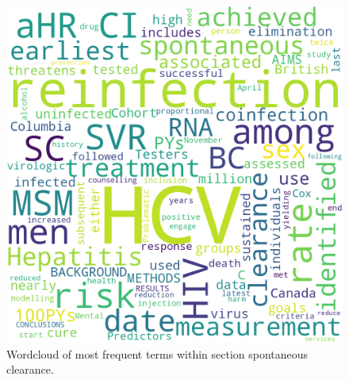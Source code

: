\documentclass{qqtarticle}
\begin{document}
        \begin{figure}[H]
            \centering
            \includegraphics[width=.75\linewidth]{img/spontaneousclearance.png}
            \caption{Wordcloud of most frequent terms within section spontaneous clearance.}
            \label{fig:wcl_spontaneousclearance}
        \end{figure}
\end{document}
